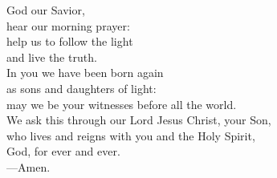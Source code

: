 \prayer


\begin{prayerverse}
God our Savior,\\
hear our morning prayer:\\
help us to follow the light\\
and live the truth.\\
In you we have been born again\\
as sons and daughters of light:\\
may we be your witnesses before all the world.\\
We ask this through our Lord Jesus Christ, your Son,\\
who lives and reigns with you and the Holy Spirit,\\
God, for ever and ever.\\
{\color{red}---\thinspace}Amen.
\end{prayerverse}

